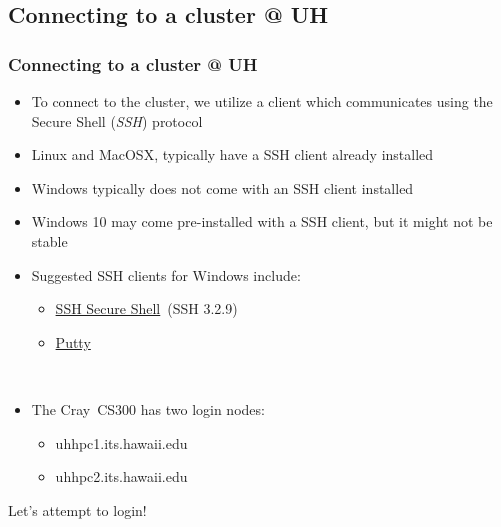\documentclass[t,hyperref={pdfpagelabels=false}]{beamer}
\newcommand{\craycs}{Cray~CS300}
\begin{document}
\subsection{Connecting to a cluster @ UH}
\begin{frame}
	\frametitle{Connecting to a cluster @ UH}
	\begin{description}[\setlength{\leftmargini}{0pt}]
	\item[] \begin{itemize}
		\item To connect to the cluster, we utilize a client which communicates using the Secure Shell (\emph{SSH}) protocol 
		\item Linux and MacOSX, typically have a SSH client already installed
		\item Windows typically does not come with an SSH client installed
		\item Windows 10 may come pre-installed with a SSH client, but it might not be stable
		\item Suggested SSH clients for Windows include:
		\begin{itemize}
			\item \href{http://www.hawaii.edu/askus/685}{SSH Secure Shell}~(SSH 3.2.9)
			\item \href{http://www.chiark.greenend.org.uk/~sgtatham/putty/download.html}{Putty}
		\end{itemize}
	\end{itemize}
	\item[] ~\\
	\item[] \begin{itemize}
		\item The {\craycs} has two login nodes:
		\begin{itemize}
			\item uhhpc1.its.hawaii.edu
			\item uhhpc2.its.hawaii.edu
		\end{itemize}
	\end{itemize}
	\end{description}
	{\large Let's attempt to login!}
\end{frame}
\end{document}
